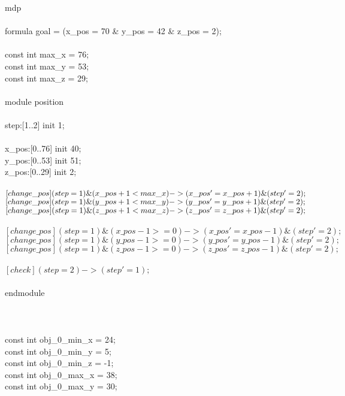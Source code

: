 \documentclass{article}
\begin{document}
mdp\\
\\
formula goal = (x\_pos = 70 \& y\_pos = 42 \& z\_pos = 2);\\
\\
const int max\_x = 76;\\
const int max\_y = 53;\\
const int max\_z = 29;\\
\\
module position\\
\\
    step:[1..2] init 1;\\
\\
    x\_pos:[0..76] init 40;\\
    y\_pos:[0..53] init 51;\\
    z\_pos:[0..29] init 2;\\
\\    
    $[change\_pos] (step = 1) \& (x\_pos + 1 < max\_x)\\
    -> (x\_pos' = x\_pos + 1) \& (step' = 2);$\\
    $[change\_pos] (step = 1) \& (y\_pos + 1 < max\_y)\\
    ->(y\_pos' = y\_pos + 1) \& (step' = 2);$\\
    $[change\_pos] (step = 1) \& (z\_pos + 1 < max\_z)\\
    ->(z\_pos' = z\_pos + 1) \& (step' = 2);$\\
\\   
    $[change\_pos] (step = 1) \& (x\_pos - 1 >= 0) -> (x\_pos' = x\_pos - 1) \& (step' = 2);$\\
    $[change\_pos] (step = 1) \& (y\_pos - 1 >= 0) -> (y\_pos' = y\_pos - 1) \& (step' = 2);$\\
    $[change\_pos] (step = 1) \& (z\_pos - 1 >= 0) -> (z\_pos' = z\_pos - 1) \& (step' = 2);$\\
\\   
    $[check] (step = 2) -> (step' = 1);$\\
\\
endmodule\\
\\
\\    
\\   
const int obj\_0\_min\_x = 24;\\
const int obj\_0\_min\_y = 5;\\
const int obj\_0\_min\_z = -1;\\
const int obj\_0\_max\_x = 38;\\
const int obj\_0\_max\_y = 30;\\
\end{document}
